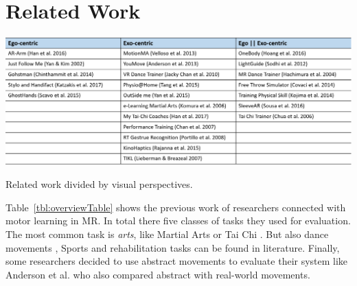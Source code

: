 \chapter{Related Work}
\begin{table}[h]
	\centering
	\includegraphics[width=1.0\textwidth]{img/overview_table.png}
	\caption{Related work divided by visual perspectives.}
	\label{tbl:overviewTable}
\end{table}
Table~\ref{tbl:overviewTable} shows the previous work of researchers connected with motor learning in MR. In total there five classes of tasks they used for evaluation. The most common task is \textit{arts}, like Martial Arts or Tai Chi \cite{Han2016, Yang2002, Katzakis2017, Han2017, Portillo2008, Hoang2016, Chua2003, Komura2006}. But also dance movements \cite{Anderson2013a, Yan2015, Chan2010, Chan2007, Hachimura2004}, Sports \cite{Covaci2014, Kojima2014} and rehabilitation tasks \cite{Velloso2013, Chinthammit2014, Tang2015, Rajanna2015, Sousa2016} can be found in literature. Finally, some researchers decided to use abstract movements \cite{Sodhi2012, Lieberman2007} to evaluate their system like Anderson et al. \cite{Anderson2013a} who also compared abstract with real-world movements.\\
